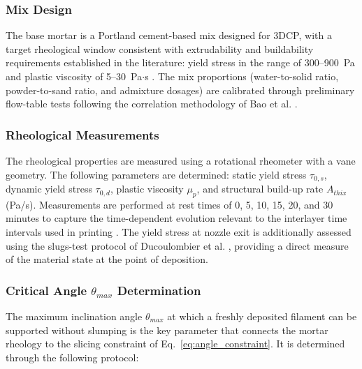 \documentclass[conference]{IEEEtran}
\begin{document}
\subsubsection{Mix Design}

The base mortar is a Portland cement-based mix designed for 3DCP, with a target rheological window consistent with extrudability and buildability requirements established in the literature: yield stress in the range of 300--900~Pa and plastic viscosity of 5--30~Pa$\cdot$s \cite{bos_juxtaposing_2021, bao_testing_2024}. The mix proportions (water-to-solid ratio, powder-to-sand ratio, and admixture dosages) are calibrated through preliminary flow-table tests following the correlation methodology of Bao et al. \cite{bao_testing_2024}.

\subsubsection{Rheological Measurements}

The rheological properties are measured using a rotational rheometer with a vane geometry. The following parameters are determined: static yield stress $\tau_{0,s}$, dynamic yield stress $\tau_{0,d}$, plastic viscosity $\mu_p$, and structural build-up rate $A_{thix}$ (Pa/s). Measurements are performed at rest times of 0, 5, 10, 15, 20, and 30 minutes to capture the time-dependent evolution relevant to the interlayer time intervals used in printing \cite{bos_juxtaposing_2021, rehman_recommendations_2023}. The yield stress at nozzle exit is additionally assessed using the slugs-test protocol of Ducoulombier et al. \cite{ducoulombier_slugs-test_2021}, providing a direct measure of the material state at the point of deposition.

\subsubsection{Critical Angle $\theta_{max}$ Determination}
\label{subsubsec:thetamax}

The maximum inclination angle $\theta_{max}$ at which a freshly deposited filament can be supported without slumping is the key parameter that connects the mortar rheology to the slicing constraint of Eq.~\ref{eq:angle_constraint}. It is determined through the following protocol:
\end{document}
